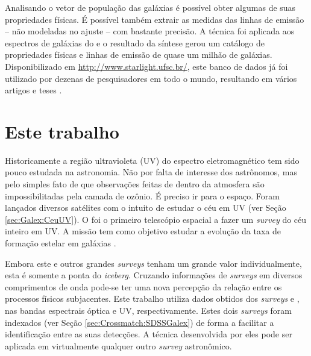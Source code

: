 Analisando o vetor de população das galáxias é possível obter algumas de suas
propriedades físicas. É possível também extrair as medidas das linhas de emissão
-- não modeladas no ajuste -- com bastante precisão. A técnica foi aplicada aos
espectros de galáxias do \SDSS e o resultado da síntese gerou um catálogo de
propriedades físicas e linhas de emissão de quase um milhão de galáxias.
Disponibilizado em \url{http://www.starlight.ufsc.br/}, este banco de dados já
foi utilizado por dezenas de pesquisadores em todo o mundo, resultando em vários
artigos \citep[para citar alguns]{Bian2006, Liang2007, Peeples2009,
Lara-Lopez2009, Lara-Lopez2010} e teses \citep{Mateus2006, Gomes2009,
Asari2010}.



\section{Este trabalho}
\label{sec:Intro:EsteTrab}

Historicamente a região ultravioleta (UV) do espectro eletromagnético tem sido
pouco estudada na astronomia. Não por falta de interesse dos astrônomos, mas
pelo simples fato de que observações feitas de dentro da atmosfera são
impossibilitadas pela camada de ozônio. É preciso ir para o espaço. Foram
lançados diversos satélites com o intuito de estudar o céu em UV (ver Seção
\ref{sec:Galex:CeuUV}). O \galex foi o primeiro telescópio espacial a fazer um
{\em survey} do céu inteiro em UV. A missão tem como objetivo estudar a evolução
da taxa de formação estelar em galáxias \citep{Martin2005}.

Embora este e outros grandes {\em surveys} tenham um grande valor
individualmente, esta é somente a ponta do {\em iceberg}. Cruzando informações
de {\em surveys} em diversos comprimentos de onda pode-se ter uma nova percepção
da relação entre os processos físicos subjacentes. Este trabalho utiliza dados
obtidos dos {\em surveys} \SDSS e \galex, nas bandas espectrais óptica e UV,
respectivamente. Estes dois {\em surveys} foram indexados (ver Seção
\ref{sec:Crossmatch:SDSSGalex}) de forma a facilitar a identificação entre as
suas detecções. A técnica desenvolvida por eles pode ser aplicada em
virtualmente qualquer outro {\em survey} astronômico.

